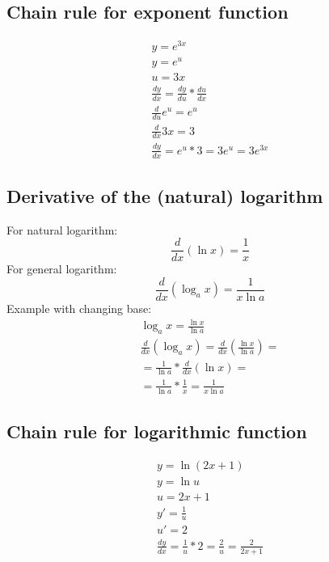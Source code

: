 \documentclass{article}
\begin{document}
\subsection{Chain rule for exponent function}
\begin{equation}
  \begin{gathered}
    y = e^{3x} \\
    y = e^u \\
    u = 3x \\
    \frac{dy}{dx} = \frac{dy}{du} * \frac{du}{dx} \\
    \frac{d}{du} e^u = e^u \\
    \frac{d}{dx} 3x = 3 \\
    \frac{dy}{dx} = e^u * 3 = 3e^u = 3e^{3x}
  \end{gathered}
\end{equation}

\subsection{Derivative of the (natural) logarithm}
For natural logarithm:
\begin{equation}
  \frac{d}{dx}(\ln x) = \frac{1}{x}
\end{equation}
For general logarithm:
\begin{equation}
  \frac{d}{dx}(\log_a x) = \frac{1}{x\ln a}
\end{equation}
Example with changing base:
\begin{equation}
  \begin{gathered}
  \log_ax = \frac{\ln x}{\ln a} \\
  \frac{d}{dx}(\log_ax) = \frac{d}{dx}(\frac{\ln x}{\ln a}) = \\
  = \frac{1}{\ln a} * \frac{d}{dx}(\ln x) = \\
  = \frac{1}{\ln a} * \frac{1}{x} = \frac{1}{x\ln a}
  \end{gathered}
\end{equation}
\subsection{Chain rule for logarithmic function}
\begin{equation}
  \begin{gathered}
  y = \ln(2x+1) \\
  y = \ln u \\
  u = 2x+1 \\
  y' = \frac{1}{u} \\
  u' = 2 \\
  \frac{dy}{dx} = \frac{1}{u} * 2 = \frac{2}{u} = \frac{2}{2x+1}
  \end{gathered}
\end{equation}
\end{document}
